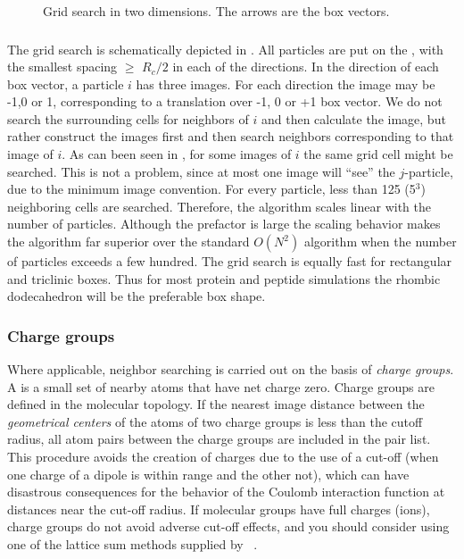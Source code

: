 \begin{figure}
\centerline{}
\caption {Grid search in two dimensions. The arrows are the box vectors.}
\label{fig:grid}
\end{figure}

\subsubsection{}
\label{sec:nsgrid}
The grid search is schematically depicted in .
All particles are put on the {\nsgrid}, with the smallest spacing
$\ge$ $R_c/2$ in each of the directions.
In the direction of each box vector, a particle $i$ has three images. For each
direction the image may be -1,0 or 1, corresponding to a translation
over -1, 0 or +1 box vector. We do not search the surrounding
{\nsgrid} cells for neighbors of $i$ and then calculate the image, but
rather construct the images first and then search neighbors
corresponding to that image of $i$.
As can been seen in , for some images of $i$ the same
grid cell might be searched. This is not a problem, since at most one
image will ``see'' the $j$-particle, due to the minimum image convention.
For every particle, less than 125 (5$^3$) neighboring cells are searched.
Therefore, the algorithm scales linear with the number of particles.
Although the prefactor is large
the scaling behavior makes the algorithm far superior over the
standard $O(N^2)$ algorithm when the number of particles
exceeds a few hundred.
The grid search is equally fast for rectangular and triclinic boxes.
Thus for most protein and peptide simulations the rhombic dodecahedron
will be the preferable box shape.

\subsubsection{Charge groups}
Where applicable, neighbor searching is carried out on the basis of
{\em charge groups}. A  is a small set of
nearby atoms that have net charge zero. Charge groups are defined in
the molecular topology. If the nearest image distance between the {\em
geometrical centers} of the atoms of two charge groups is less than
the cutoff radius, all atom pairs between the charge groups are
included in the pair list. This procedure avoids the creation of
charges due to the use of a cut-off (when one charge of a dipole is
within range and the other not), which can have disastrous
consequences for the behavior of the Coulomb interaction function at
distances near the cut-off radius. If molecular groups have full
charges (ions), charge groups do not avoid adverse cut-off effects,
and you should consider using one of the lattice sum methods supplied
by {\gromacs}~\cite{Berendsen93a}.

